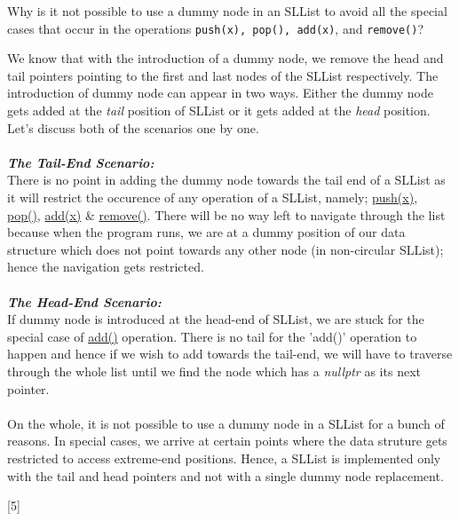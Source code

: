 \documentclass[addpoints]{exam}
\begin{document}
\begin{questions}
	Why is it not possible to use a dummy node in an SLList to avoid all the special cases that occur in the operations {\tt push(x), pop(), add(x)}, and {\tt remove()}?
	\begin{solution}
		We know that with the introduction of a dummy node, we remove the head and tail pointers pointing to the first and last nodes of the SLList respectively. The introduction of dummy node can appear in two ways. Either the dummy node gets added at the \textit{tail} position of SLList or it gets added at the \textit{head} position. Let's discuss both of the scenarios one by one.\\ \\ \textbf{\textit{The Tail-End Scenario:}}\\ There is no point in adding the dummy node towards the tail end of a SLList as it will restrict the occurence of any operation of a SLList, namely; \underline{push(x)}, \underline{pop()}, \underline{add(x)} \& \underline{remove()}. There will be no way left to navigate through the list because when the program runs, we are at a dummy position of our data structure which does not point towards any other node (in non-circular SLList); hence the navigation gets restricted. \\ \\\textbf{\textit{The Head-End Scenario:}}\\ If dummy node is introduced at the head-end of SLList, we are stuck for the special case of \underline{add()} operation. There is no tail for the 'add()' operation to happen and hence if we wish to add towards the tail-end, we will have to traverse through the whole list until we find the node which has a \textit{nullptr} as its next pointer. \\ \\ On the whole, it is not possible to use a dummy node in a SLList for a bunch of reasons. In special cases, we arrive at certain points where the data struture gets restricted to access extreme-end positions. Hence, a SLList is implemented only with the tail and head pointers and not with a single dummy node replacement. 
	\end{solution}
	\pagebreak
	
	

\end{questions}
\end{document}
